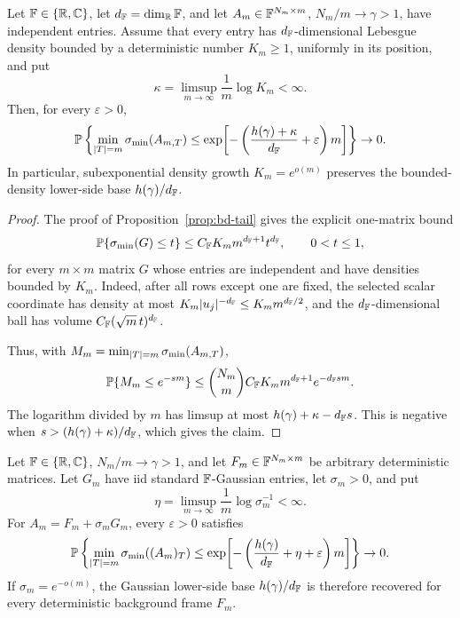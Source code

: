 \begin{theorem}\label{thm:density-rate-lower}
Let \(\mathbb{F}\in\{\mathbb{R},\mathbb{C}\}\), let \(d_{\mathbb{F}}=\dim_{\mathbb{R}}\mathbb{F}\), and let
\(A_m\in\mathbb{F}^{N_m\times m}\), \(N_m/m\to\gamma>1\), have independent entries.  Assume
that every entry has \(d_{\mathbb{F}}\)-dimensional Lebesgue density bounded by a
deterministic number \(K_m\ge1\), uniformly in its position, and put
\[
  \kappa=\limsup_{m\to\infty}\frac1m\log K_m<\infty .
\]
Then, for every \(\varepsilon>0\),
\[
  \mathbb{P}\left\{
  \min_{|T|=m}\sigma_{\min}(A_{m,T})
  \le
  \exp\!\left[-\left(\frac{h(\gamma)+\kappa}{d_{\mathbb{F}}}+\varepsilon\right)m\right]
  \right\}\to0.
\]
In particular, subexponential density growth \(K_m=e^{o(m)}\) preserves the
bounded-density lower-side base \(h(\gamma)/d_{\mathbb{F}}\).
\end{theorem}

\begin{proof}
The proof of Proposition~\ref{prop:bd-tail} gives the explicit one-matrix bound
\[
  \mathbb{P}\{\sigma_{\min}(G)\le t\}\le C_{\mathbb{F}} K_m m^{d_{\mathbb{F}}+1}t^{d_{\mathbb{F}}},\qquad 0<t\le1,
\]
for every \(m\times m\) matrix \(G\) whose entries are independent and have
densities bounded by \(K_m\).  Indeed, after all rows except one are fixed, the
selected scalar coordinate has density at most \(K_m|u_j|^{-d_{\mathbb{F}}}\le
K_m m^{d_{\mathbb{F}}/2}\), and the \(d_{\mathbb{F}}\)-dimensional ball has volume
\(C_{\mathbb{F}}(\sqrt m\,t)^{d_{\mathbb{F}}}\).

Thus, with \(M_m=\min_{|T|=m}\sigma_{\min}(A_{m,T})\),
\[
  \mathbb{P}\{M_m\le e^{-sm}\}
  \le \binom{N_m}{m} C_{\mathbb{F}} K_m m^{d_{\mathbb{F}}+1}e^{-d_{\mathbb{F}} sm}.
\]
The logarithm divided by \(m\) has limsup at most \(h(\gamma)+\kappa-d_{\mathbb{F}} s\).
This is negative when
\(s>(h(\gamma)+\kappa)/d_{\mathbb{F}}\), which gives the claim.
\end{proof}

\begin{corollary}\label{cor:smoothed-lower}
Let \(\mathbb{F}\in\{\mathbb{R},\mathbb{C}\}\), \(N_m/m\to\gamma>1\), and let
\(F_m\in\mathbb{F}^{N_m\times m}\) be arbitrary deterministic matrices.  Let \(G_m\)
have iid standard \(\mathbb{F}\)-Gaussian entries, let \(\sigma_m>0\), and put
\[
  \eta=\limsup_{m\to\infty}\frac1m\log\sigma_m^{-1}<\infty .
\]
For \(A_m=F_m+\sigma_m G_m\), every \(\varepsilon>0\) satisfies
\[
  \mathbb{P}\left\{
  \min_{|T|=m}\sigma_{\min}((A_m)_T)
  \le \exp\!\left[-\left(\frac{h(\gamma)}{d_{\mathbb{F}}}+\eta+\varepsilon\right)m\right]
  \right\}\to0.
\]
If \(\sigma_m=e^{-o(m)}\), the Gaussian lower-side base \(h(\gamma)/d_{\mathbb{F}}\) is
therefore recovered for every deterministic background frame \(F_m\).
\end{corollary}

